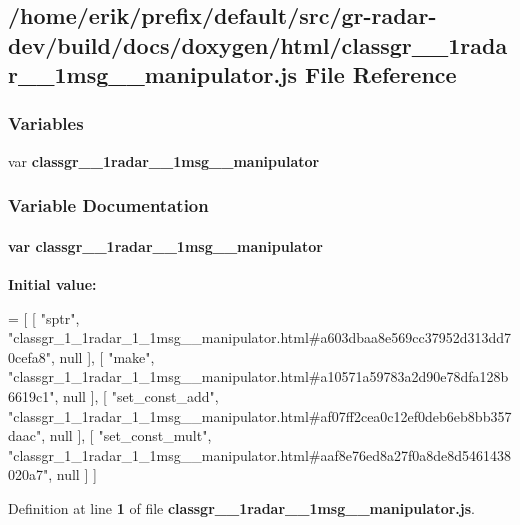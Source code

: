 \subsection{/home/erik/prefix/default/src/gr-\/radar-\/dev/build/docs/doxygen/html/classgr\+\_\+\_\+1radar\+\_\+\_\+1msg\+\_\+\+\_\+manipulator.js File Reference}
\label{classgr__1__1radar__1__1msg____manipulator_8js}
\subsubsection*{Variables}
\begin{DoxyCompactItemize}
\item 
var {\bf classgr\+\_\+\_\+1radar\+\_\+\_\+1msg\+\_\+\+\_\+manipulator}
\end{DoxyCompactItemize}


\subsubsection{Variable Documentation}
\paragraph[{classgr\+\_\+1\+\_\+1radar\+\_\+1\+\_\+1msg\+\_\+\+\_\+manipulator}]{\setlength{\rightskip}{0pt plus 5cm}var classgr\+\_\+\_\+1radar\+\_\+\_\+1msg\+\_\+\+\_\+manipulator}\label{classgr__1__1radar__1__1msg____manipulator_8js_a49e75c566144611e2c11cbeaad120201}
{\bfseries Initial value\+:}
\begin{DoxyCode}
=
[
    [ \textcolor{stringliteral}{"sptr"}, \textcolor{stringliteral}{"classgr\_1\_1radar\_1\_1msg\_\_manipulator.html#a603dbaa8e569cc37952d313dd70cefa8"}, null ],
    [ \textcolor{stringliteral}{"make"}, \textcolor{stringliteral}{"classgr\_1\_1radar\_1\_1msg\_\_manipulator.html#a10571a59783a2d90e78dfa128b6619c1"}, null ],
    [ \textcolor{stringliteral}{"set\_const\_add"}, \textcolor{stringliteral}{"classgr\_1\_1radar\_1\_1msg\_\_manipulator.html#af07ff2cea0c12ef0deb6eb8bb357daac"}, null 
      ],
    [ \textcolor{stringliteral}{"set\_const\_mult"}, \textcolor{stringliteral}{"classgr\_1\_1radar\_1\_1msg\_\_manipulator.html#aaf8e76ed8a27f0a8de8d5461438020a7"}, null
       ]
]
\end{DoxyCode}


Definition at line {\bf 1} of file {\bf classgr\+\_\+\_\+1radar\+\_\+\_\+1msg\+\_\+\+\_\+manipulator.\+js}.


